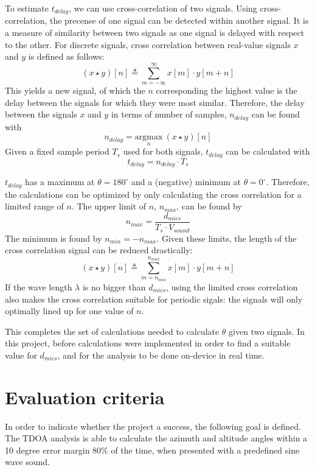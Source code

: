 \documentclass[a4paper]{article}
\begin{document}
To estimate $t_{delay}$, we can use cross-correlation of two signals. Using cross-correlation, the precense of one signal can be detected within another signal. It is a measure of similarity between two signals as one signal is delayed with respect to the other. For discrete signals, cross correlation between real-value signals $x$ and $y$ is defined as follows: \[(x \star y)[n] \triangleq \sum_{m = -\infty}^ {\infty} x[m]\cdot y[m + n]\] This yields a new signal, of which the $n$ corresponding the highest value is the delay between the signals for which they were most similar. Therefore, the delay between the signals $x$ and $y$ in terms of number of samples, $n_{delay}$ can be found with \[n_{delay} = \underset{n}{\mathrm{argmax}}\ (x \star y)[n]\] Given a fixed sample period $T_s$ used for both signals, $t_{delay}$ can be calculated with \[t_{delay} = n_{delay} \cdot T_s\]

$t_{delay}$ has a maximum at $\theta = 180^{\circ}$ and a (negative) minimum at $\theta = 0^{\circ}$. Therefore, the calculations can be optimized by only calculating the cross correlation for a limited range of $n$. The upper limit of $n$, $n_{max}$, can be found by \[n_{max} = \frac{d_{mics}}{T_s \cdot V_{sound}}\] The minimum is found by $n_{min} = -n_{max}$. Given these limits, the length of the cross correlation signal can be reduced drastically:\[(x \star y)[n] \triangleq \sum_{m = n_{min}}^ {n_{max}} x[m]\cdot y[m + n]\] If the wave length $\lambda$ is no bigger than $d_{mics}$, using the limited cross correlation also makes the cross correlation suitable for periodic sigals: the signals will only optimally lined up for one value of $n$.

This completes the set of calculations needed to calculate $\theta$ given two signals. In this project, before calculations were implemented in order to find a suitable value for $d_{mics}$, and for the analysis to be done on-device in real time.

\section{Evaluation criteria}
In order to indicate whether the project a success, the following goal is defined. The TDOA analysis is able to calculate the azimuth and altitude angles within a 10 degree error margin 80\% of the time, when presented with a predefined sine wave sound.
\end{document}
